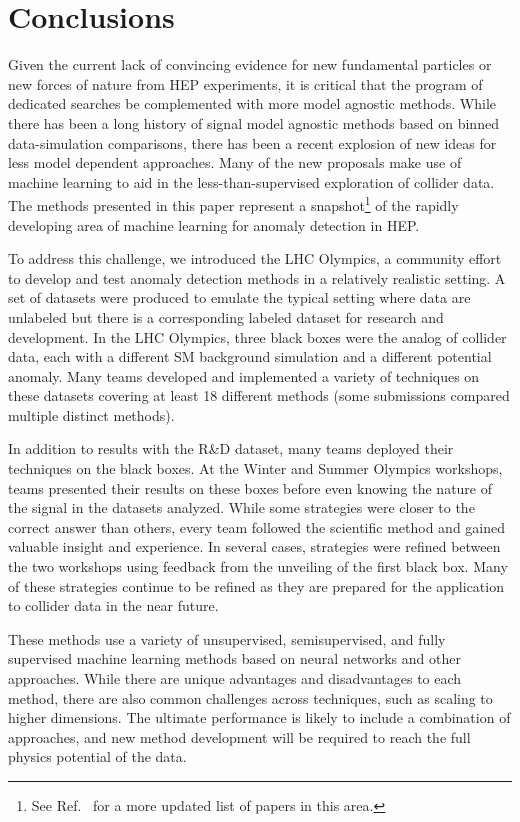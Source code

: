 \documentclass[a4paper,11pt]{article}
\begin{document}
\clearpage

\section{Conclusions}
\label{sec:conclusion}


Given the current lack of convincing evidence for new fundamental particles or new forces of nature from HEP experiments, it is critical that the program of dedicated searches be complemented with more model agnostic methods.  While there has been a long history of signal model agnostic methods based on binned data-simulation comparisons, there has been a recent explosion of new ideas for less model dependent approaches.  Many of the new proposals make use of machine learning to aid in the less-than-supervised exploration of collider data.  The methods presented in this paper represent a snapshot\footnote{See Ref.~\cite{livingreview} for a more updated list of papers in this area.} of the rapidly developing area of machine learning for anomaly detection in HEP. 

To address this challenge, we introduced the LHC Olympics, a community effort to develop and test anomaly detection methods in a relatively realistic setting.  A set of datasets were produced to emulate the typical setting where data are unlabeled but there is a corresponding labeled dataset for research and development.  In the LHC Olympics, three black boxes were the analog of collider data, each with a different SM background simulation and a different potential anomaly.  Many teams developed and implemented a variety of techniques on these datasets covering at least 18 different methods (some submissions compared multiple distinct methods).  

In addition to results with the R\&D dataset, many teams deployed their techniques on the black boxes.  At the Winter and Summer Olympics workshops, teams presented their results on these boxes before even knowing the nature of the signal in the datasets analyzed.  While some strategies were closer to the correct answer than others, every team followed the scientific method and gained valuable insight and experience.  In several cases, strategies were refined between the two workshops using feedback from the unveiling of the first black box.  Many of these strategies continue to be refined as they are prepared for the application to collider data in the near future.

These methods use a variety of unsupervised, semisupervised, and fully supervised machine learning methods based on neural networks and other approaches.  While there are unique advantages and disadvantages to each method, there are also common challenges across techniques, such as scaling to higher dimensions. The ultimate performance is likely to include a combination of approaches, and new method development will be required to reach the full physics potential of the data.
\end{document}
